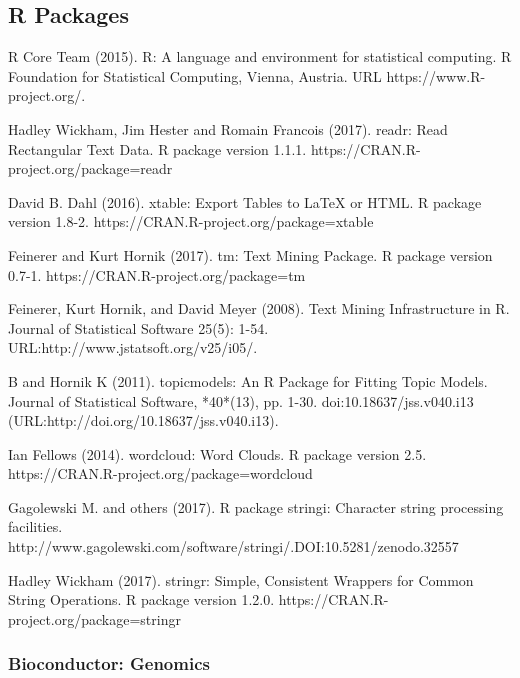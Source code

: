 
\begin{thebibliography}{00}
	\tiny
	\subsection{R Packages}
	
	R Core Team (2015). 
	\newblock R: A language and environment for statistical computing. R Foundation for Statistical Computing, Vienna, Austria.
	\newblock URL https://www.R-project.org/.
	
	 Hadley Wickham, Jim Hester and Romain Francois (2017). readr: Read
	\newblock Rectangular Text Data. R package version 1.1.1.
	\newblock https://CRAN.R-project.org/package=readr
	
	 David B. Dahl (2016). 
	\newblock xtable: Export Tables to LaTeX or HTML. R package version 1.8-2.
	\newblock https://CRAN.R-project.org/package=xtable
	
	  Feinerer and Kurt Hornik (2017).
	\newblock tm: Text Mining Package. 
	\newblock R package version 0.7-1. https://CRAN.R-project.org/package=tm
	
	  Feinerer, Kurt Hornik, and David Meyer (2008). 
	\newblock Text Mining Infrastructure in R. 
	\newblock Journal of Statistical Software 25(5): 1-54. URL:http://www.jstatsoft.org/v25/i05/.
	
	 B and Hornik K (2011).
	\newblock topicmodels: An R Package for Fitting Topic Models.
	\newblock Journal of Statistical Software, *40*(13), pp. 1-30. doi:10.18637/jss.v040.i13 (URL:http://doi.org/10.18637/jss.v040.i13).
	
	 Ian Fellows (2014). 
	\newblock wordcloud: Word Clouds. R package version 2.5.
	\newblock https://CRAN.R-project.org/package=wordcloud
	
	 Gagolewski M. and others (2017). 
	\newblock R package stringi: Character string processing facilities. 
	\newblock http://www.gagolewski.com/software/stringi/.DOI:10.5281/zenodo.32557
	
	 Hadley Wickham (2017).
	\newblock stringr: Simple, Consistent Wrappers for Common String Operations. 
	\newblock R package version 1.2.0. https://CRAN.R-project.org/package=stringr
	
\subsubsection{Bioconductor: Genomics}


\end{thebibliography}
